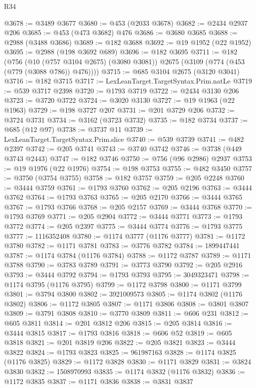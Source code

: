 \begin{lexlean}{R34}
\begin{coremodule}
@3678 := @3489 @3677
@3680 := @453 (@2033 @3678)
@3682 := @2434 @2937 @206
@3685 := @453 (@473 @3682) @476
@3686 := @3680 @3685
@3688 := @2988 (@3488 @3686)
@3689 := @182 @3688
@3692 := @19 @1952 (@22 @1952)
@3695 := @2988 (@198 @3692 @689)
@3696 := @182 @3695
@3711 := @182
    (@756
      (@10 (@757 @3104 @2675) (@3080 @3081))
      @2675
      (@3109 (@774 (@453 (@779 (@3088 @786)) @476))))
@3715 := @685 @3104 @2675 (@3120 @3041)
@3716 := @182 @3715
@3717 := LexLeanTarget.TargetSyntax.Prim.natLe
@3719 := @539 @3717 @2398
@3720 := @1793 @3719
@3722 := @2434 @3130 @206
@3723 := @3720 @3722
@3724 := @3020 @3130
@3727 := @19 @1963 (@22 @1963)
@3729 := @198 @3727 @207
@3731 := @201 @3729 @206
@3732 := @3724 @3731
@3734 := @3162 (@3723 @3732)
@3735 := @182 @3734
@3737 := @685 (@12 @97)
@3738 := @3737 @11
@3739 := LexLeanTarget.TargetSyntax.Prim.slice
@3740 := @539 @3739
@3741 := @482 @2397
@3742 := @205 @3741
@3743 := @3740 @3742
@3746 := @3738 (@449 @3743 @2443)
@3747 := @182 @3746
@3750 := @756 (@96 @2986) @2937
@3753 := @19 @1976 (@22 @1976)
@3754 := @198 @3753
@3755 := @482 @3450
@3757 := @3750 (@3754 @3755)
@3758 := @182 @3757
@3759 := @205 @2248
@3760 := @3444 @3759
@3761 := @1793 @3760
@3762 := @205 @2196
@3763 := @3444 @3762
@3764 := @1793 @3763
@3765 := @205 @2170
@3766 := @3444 @3765
@3767 := @1793 @3766
@3768 := @205 @2157
@3769 := @3444 @3768
@3770 := @1793 @3769
@3771 := @205 @2904
@3772 := @3444 @3771
@3773 := @1793 @3772
@3774 := @205 @2397
@3775 := @3444 @3774
@3776 := @1793 @3775
@3777 := 1116352408
@3780 := @1174 @3777 (@1176 @3777)
@3781 := @1172 @3780
@3782 := @1171 @3781
@3783 := @3776 @3782
@3784 := 1899447441
@3787 := @1174 @3784 (@1176 @3784)
@3788 := @1172 @3787
@3789 := @1171 @3788
@3790 := @3783 @3789
@3791 := @3773 @3790
@3792 := @205 @2916
@3793 := @3444 @3792
@3794 := @1793 @3793
@3795 := 3049323471
@3798 := @1174 @3795 (@1176 @3795)
@3799 := @1172 @3798
@3800 := @1171 @3799
@3801 := @3794 @3800
@3802 := 3921009573
@3805 := @1174 @3802 (@1176 @3802)
@3806 := @1172 @3805
@3807 := @1171 @3806
@3808 := @3801 @3807
@3809 := @3791 @3808
@3810 := @3770 @3809
@3811 := @606 @231
@3812 := @605 @3811
@3814 := @201 @3812 @206
@3815 := @205 @3814
@3816 := @3444 @3815
@3817 := @1793 @3816
@3818 := @606 @52
@3819 := @605 @3818
@3821 := @201 @3819 @206
@3822 := @205 @3821
@3823 := @3444 @3822
@3824 := @1793 @3823
@3825 := 961987163
@3828 := @1174 @3825 (@1176 @3825)
@3829 := @1172 @3828
@3830 := @1171 @3829
@3831 := @3824 @3830
@3832 := 1508970993
@3835 := @1174 @3832 (@1176 @3832)
@3836 := @1172 @3835
@3837 := @1171 @3836
@3838 := @3831 @3837

\end{coremodule}
\end{lexlean}
